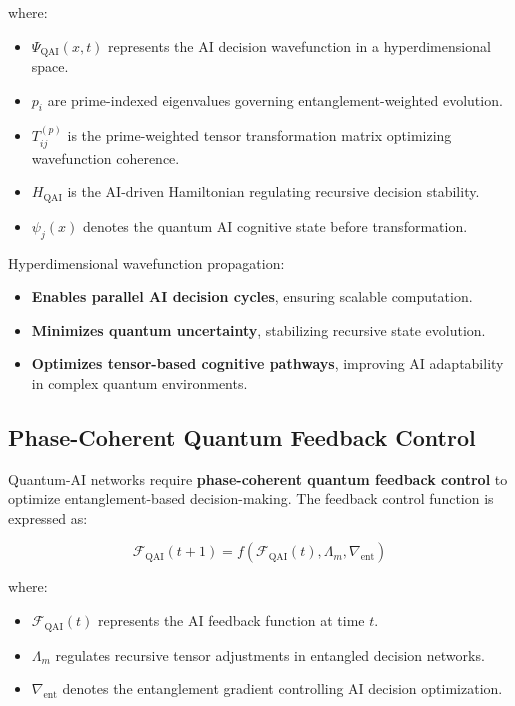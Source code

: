 \documentclass{article}
\theoremstyle{plain}
\begin{document}
\begin{itemize}
where:
\begin{itemize}
    \item \( \Psi_{\text{QAI}}(x,t) \) represents the AI decision wavefunction in a hyperdimensional space.
    \item \( p_i \) are prime-indexed eigenvalues governing entanglement-weighted evolution.
    \item \( T_{ij}^{(p)} \) is the prime-weighted tensor transformation matrix optimizing wavefunction coherence.
    \item \( H_{\text{QAI}} \) is the AI-driven Hamiltonian regulating recursive decision stability.
    \item \( \psi_j (x) \) denotes the quantum AI cognitive state before transformation.
\end{itemize}

Hyperdimensional wavefunction propagation:
\begin{itemize}
    \item \textbf{Enables parallel AI decision cycles}, ensuring scalable computation.
    \item \textbf{Minimizes quantum uncertainty}, stabilizing recursive state evolution.
    \item \textbf{Optimizes tensor-based cognitive pathways}, improving AI adaptability in complex quantum environments.
\end{itemize}

\subsection{Phase-Coherent Quantum Feedback Control}

Quantum-AI networks require \textbf{phase-coherent quantum feedback control} to optimize entanglement-based decision-making. The feedback control function is expressed as:

\begin{equation}
    \mathcal{F}_{\text{QAI}} (t+1) = f( \mathcal{F}_{\text{QAI}} (t), \Lambda_m, \nabla_{\text{ent}})
\end{equation}

where:
\begin{itemize}
    \item \( \mathcal{F}_{\text{QAI}} (t) \) represents the AI feedback function at time \( t \).
    \item \( \Lambda_m \) regulates recursive tensor adjustments in entangled decision networks.
    \item \( \nabla_{\text{ent}} \) denotes the entanglement gradient controlling AI decision optimization.
\end{itemize}


\end{itemize}
\end{document}
